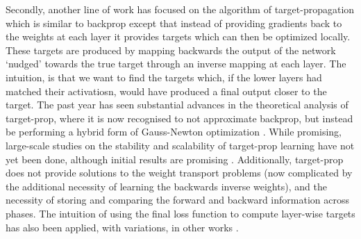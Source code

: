 Secondly, another line of work has focused on the algorithm of target-propagation \citep{bengio2015early,lee2015difference,} which is similar to backprop except that instead of providing gradients back to the weights at each layer it provides targets which can then be optimized locally. These targets are produced by mapping backwards the output of the network `nudged' towards the true target through an inverse mapping at each layer. The intuition, is that we want to find the targets which, if the lower layers had matched their activatiosn, would have produced a final output closer to the target. The past year has seen substantial advances in the theoretical analysis of target-prop, where it is now recognised to not approximate backprop, but instead be performing a hybrid form of Gauss-Newton optimization \citep{bengio2020deriving,meulemans2020theoretical}. While promising, large-scale studies on the stability and scalability of target-prop learning have not yet been done, although initial results are promising \citep{bartunov2018assessing}. Additionally, target-prop does not provide solutions to the weight transport problems (now complicated by the additional necessity of learning the backwards inverse weights), and the necessity of storing and comparing the forward and backward information across phases. The intuition of using the final loss function to compute layer-wise targets has also been applied, with variations, in other works \citep{ororbia2019biologically,ororbia2017learning,kaiser2020synaptic}.

